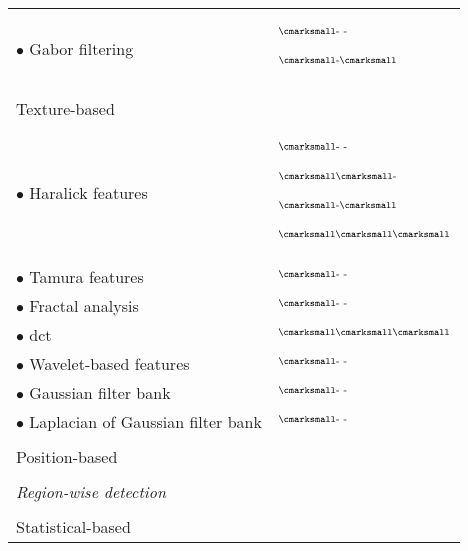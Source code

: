 \begin{longtable}{@{}l >{\raggedleft\arraybackslash}X@{}}
  \quad \quad \quad $\bullet$ Gabor filtering & $^{\text{{\cmarksmall}- -}}$\cite{Tiwari2012,Viswanath2008,Viswanath2012}\par $^{\text{{\cmarksmall}-{\cmarksmall}}}$\cite{khalvati2015automated,chung2015prostate}  \\ \\ [-1.5ex]
  \quad \quad Texture-based & \\
  \quad \quad \quad $\bullet$ Haralick features & $^{\text{{\cmarksmall}- -}}$\cite{Antic2013,Tiwari2009a,Tiwari2010,Tiwari2013,Viswanath2008,Viswanath2009,Viswanath2012,trigui2016classification,rampun2015computer,rampun2016computer,rampun2016quantitative}\par $^{\text{{\cmarksmall}{\cmarksmall}-}}$\cite{Viswanath2011}\par $^{\text{{\cmarksmall}-{\cmarksmall}}}$\cite{cameron2014multiparametric,cameron2016maps,khalvati2015automated,chung2015prostate}\par $^{\text{{\cmarksmall}{\cmarksmall}{\cmarksmall}}}$\cite{Litjens2012,Niaf2011,Niaf2012,lehaire2014computer} \\
  \quad \quad \quad $\bullet$ Tamura features & $^{\text{{\cmarksmall}- -}}$\cite{rampun2016computer,rampun2016quantitative,rampun2015computer} \\
  \quad \quad \quad $\bullet$ Fractal analysis & $^{\text{{\cmarksmall}- -}}$\cite{Lopes2011,Lv2009} \\
  \quad \quad \quad $\bullet$ \acs*{dct} & $^{\text{{\cmarksmall}{\cmarksmall}{\cmarksmall}}}$\cite{Chan2003} \\
  \quad \quad \quad $\bullet$ Wavelet-based features & $^{\text{{\cmarksmall}- -}}$\cite{Viswanath2012} \\
  \quad \quad \quad $\bullet$ Gaussian filter bank & $^{\text{{\cmarksmall}- -}}$\cite{Litjens2014,rampun2016computer,rampun2016quantitative,rampun2015computer} \\
  \quad \quad \quad $\bullet$ Laplacian of Gaussian filter bank & $^{\text{{\cmarksmall}- -}}$\cite{rampun2016computer,rampun2016quantitative,rampun2015computer} \\ \\ [-1.5ex]
  \quad \quad Position-based & \cite{Chan2003,Litjens2011,Litjens2012,Litjens2014} \\ \\ [-1.5ex]
  \quad \textit{Region-wise detection} &  \\ \\ [-1.5ex]
  \quad \quad Statistical-based & \\

\end{longtable}

